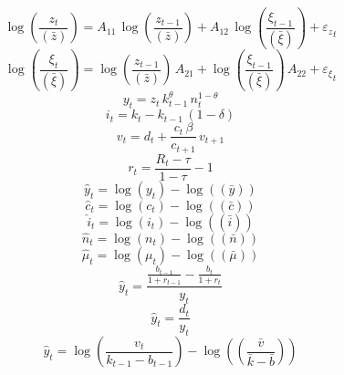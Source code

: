 \begin{dmath}
\log\left(\frac{{{z}}_{t}}{(\bar{{z}})}\right)={{A_{11}}}\, \log\left(\frac{{{z}}_{t-1}}{(\bar{{z}})}\right)+{{A_{12}}}\, \log\left(\frac{{{\xi}}_{t-1}}{(\bar{{\xi}})}\right)+{{\varepsilon_z}}_{t}
\end{dmath}
\begin{dmath}
\log\left(\frac{{{\xi}}_{t}}{(\bar{{\xi}})}\right)=\log\left(\frac{{{z}}_{t-1}}{(\bar{{z}})}\right)\, {{A_{21}}}+\log\left(\frac{{{\xi}}_{t-1}}{(\bar{{\xi}})}\right)\, {{A_{22}}}+{{\varepsilon_{\xi}}}_{t}
\end{dmath}
\begin{dmath}
{{y}}_{t}={{z}}_{t}\, {{k}}_{t-1}^{{{\theta}}}\, {{n}}_{t}^{1-{{\theta}}}
\end{dmath}
\begin{dmath}
{{i}}_{t}={{k}}_{t}-{{k}}_{t-1}\, \left(1-{{\delta}}\right)
\end{dmath}
\begin{dmath}
{{v}}_{t}={{d}}_{t}+\frac{{{c}}_{t}\, {{\beta}}}{{{c}}_{t+1}}\, {{v}}_{t+1}
\end{dmath}
\begin{dmath}
{{r}}_{t}=\frac{{{R}}_{t}-{{\tau}}}{1-{{\tau}}}-1
\end{dmath}
\begin{dmath}
{{\hat y}}_{t}=\log\left({{y}}_{t}\right)-\log\left((\bar{{y}})\right)
\end{dmath}
\begin{dmath}
{{\hat c}}_{t}=\log\left({{c}}_{t}\right)-\log\left((\bar{{c}})\right)
\end{dmath}
\begin{dmath}
{{\hat i}}_{t}=\log\left({{i}}_{t}\right)-\log\left((\bar{{i}})\right)
\end{dmath}
\begin{dmath}
{{\hat n}}_{t}=\log\left({{n}}_{t}\right)-\log\left((\bar{{n}})\right)
\end{dmath}
\begin{dmath}
{{\hat \mu}}_{t}=\log\left({{\mu}}_{t}\right)-\log\left((\bar{{\mu}})\right)
\end{dmath}
\begin{dmath}
{{\hat y}}_{t}=\frac{\frac{{{b}}_{t-1}}{1+{{r}}_{t-1}}-\frac{{{b}}_{t}}{1+{{r}}_{t}}}{{{y}}_{t}}
\end{dmath}
\begin{dmath}
{{\hat y}}_{t}=\frac{{{d}}_{t}}{{{y}}_{t}}
\end{dmath}
\begin{dmath}
{{\hat y}}_{t}=\log\left(\frac{{{v}}_{t}}{{{k}}_{t-1}-{{b}}_{t-1}}\right)-\log\left((\frac{\bar{{v}}}{\bar{{k}}-\bar{{b}}})\right)
\end{dmath}
